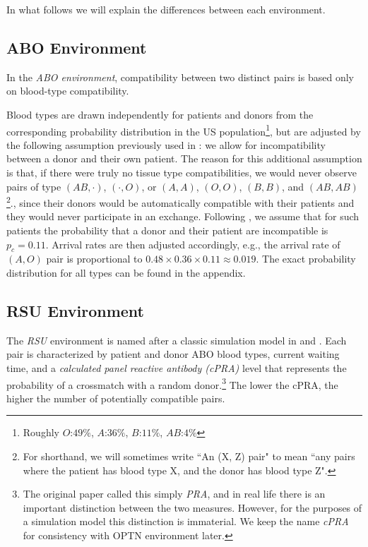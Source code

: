 In what follows we will explain the differences between each environment.


\subsection{ABO Environment}

In the \emph{ABO environment}, compatibility between two distinct pairs is based only on blood-type compatibility. 

Blood types are drawn independently for patients and donors from the corresponding probability distribution in the US population\footnote{Roughly $O$:$49\%$, $A$:$36\%$, $B$:$11\%$, $AB$:$4\%$}, but are adjusted by the following assumption previously used in \citet{unver2010dynamic}: we allow for incompatibility between a donor and their own patient. The reason for this additional assumption is that, if there were truly no tissue type compatibilities, we would never observe pairs of type $(AB,\cdot)$, $(\cdot, O)$, or $(A,A)$, $(O,O)$, $(B,B)$, and $(AB,AB)$\footnote{For shorthand, we will sometimes write ``An (X, Z) pair" to mean ``any pairs where the patient has blood type X, and the donor has blood type Z".}., since their donors would be automatically compatible with their patients and they would never participate in an exchange. Following \citet{zenios2001primum}, we assume that for such patients the probability that a donor and their patient are incompatible is $p_c = 0.11$. Arrival rates are then adjusted accordingly, e.g., the arrival rate of $(A,O)$ pair is proportional to $0.48 \times 0.36 \times 0.11 \approx 0.019$. The exact probability distribution for all types can be found in the appendix.

\subsection{RSU Environment}

The \emph{RSU} environment is named after a classic simulation model in \citet*{roth2007efficient} and \cite{saidman2006increasing}. Each pair is characterized by patient and donor ABO blood types, current waiting time, and a \emph{calculated panel reactive antibody (cPRA)} level that represents the probability of a crossmatch with a random donor.\footnote{The original \citet{roth2007efficient} paper called this simply \emph{PRA}, and in real life there is an important distinction between the two measures. However, for the purposes of a simulation model this distinction is immaterial. We keep the name \emph{cPRA} for consistency with OPTN environment later.} The lower the cPRA, the higher the number of potentially compatible pairs.

